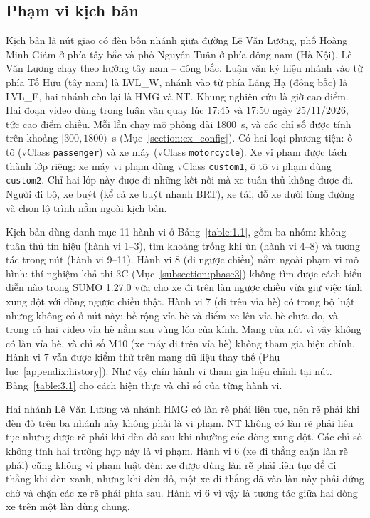\documentclass[../main.tex]{subfiles}
\begin{document}
\subsection{Phạm vi kịch bản}

Kịch bản là nút giao có đèn bốn nhánh giữa đường Lê Văn Lương, phố Hoàng Minh Giám ở phía tây bắc và phố Nguyễn Tuân ở phía đông nam (Hà Nội). Lê Văn Lương chạy theo hướng tây nam -- đông bắc. Luận văn ký hiệu nhánh vào từ phía Tố Hữu (tây nam) là LVL\_W, nhánh vào từ phía Láng Hạ (đông bắc) là LVL\_E, hai nhánh còn lại là HMG và NT. Khung nghiên cứu là giờ cao điểm. Hai đoạn video dùng trong luận văn quay lúc 17:45 và 17:50 ngày 25/11/2026, tức cao điểm chiều. Mỗi lần chạy mô phỏng dài 1800~s, và các chỉ số được tính trên khoảng $[300, 1800)$~s (Mục~\ref{section:ex_config}). Có hai loại phương tiện: ô tô (vClass \texttt{passenger}) và xe máy (vClass \texttt{motorcycle}). Xe vi phạm được tách thành lớp riêng: xe máy vi phạm dùng vClass \texttt{custom1}, ô tô vi phạm dùng \texttt{custom2}. Chỉ hai lớp này được đi những kết nối mà xe tuân thủ không được đi. Người đi bộ, xe buýt (kể cả xe buýt nhanh BRT), xe tải, đỗ xe dưới lòng đường và chọn lộ trình nằm ngoài kịch bản.

Kịch bản dùng danh mục 11 hành vi ở Bảng~\ref{table:1.1}, gồm ba nhóm: không tuân thủ tín hiệu (hành vi 1--3), tìm khoảng trống khi ùn (hành vi 4--8) và tương tác trong nút (hành vi 9--11). Hành vi 8 (đi ngược chiều) nằm ngoài phạm vi mô hình: thí nghiệm khả thi 3C (Mục~\ref{subsection:phase3}) không tìm được cách biểu diễn nào trong SUMO 1.27.0 vừa cho xe đi trên làn ngược chiều vừa giữ việc tính xung đột với dòng ngược chiều thật. Hành vi 7 (đi trên vỉa hè) có trong bộ luật nhưng không có ở nút này: bề rộng vỉa hè và điểm xe lên vỉa hè chưa đo, và trong cả hai video vỉa hè nằm sau vùng lóa của kính. Mạng của nút vì vậy không có làn vỉa hè, và chỉ số M10 (xe máy đi trên vỉa hè) không tham gia hiệu chỉnh. Hành vi 7 vẫn được kiểm thử trên mạng dữ liệu thay thế (Phụ lục~\ref{appendix:history}). Như vậy chín hành vi tham gia hiệu chỉnh tại nút. Bảng~\ref{table:3.1} cho cách hiện thực và chỉ số của từng hành vi.

Hai nhánh Lê Văn Lương và nhánh HMG có làn rẽ phải liên tục, nên rẽ phải khi đèn đỏ trên ba nhánh này không phải là vi phạm. NT không có làn rẽ phải liên tục nhưng được rẽ phải khi đèn đỏ sau khi nhường các dòng xung đột. Các chỉ số không tính hai trường hợp này là vi phạm. Hành vi 6 (xe đi thẳng chặn làn rẽ phải) cũng không vi phạm luật đèn: xe được dùng làn rẽ phải liên tục để đi thẳng khi đèn xanh, nhưng khi đèn đỏ, một xe đi thẳng đã vào làn này phải đứng chờ và chặn các xe rẽ phải phía sau. Hành vi 6 vì vậy là tương tác giữa hai dòng xe trên một làn dùng chung.
\end{document}
